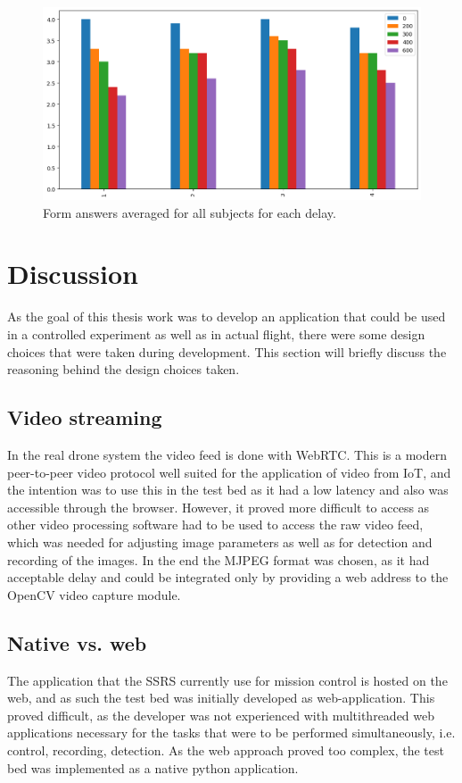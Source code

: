 \documentclass[nofilelist]{cslthse-msc}
\begin{document}
\begin{figure}[!hbt]
   \centering
   \includegraphics[scale=0.6]{images/form-ans.png} 
   \caption{Form answers averaged for all subjects for each delay.}
   \label{fig:form-ans}
\end{figure}

\chapter{Discussion}
As the goal of this thesis work was to develop an application that could be used in a controlled experiment as well as in actual flight, there were some design choices that were taken during development. This section will briefly discuss the reasoning behind the design choices taken.

\section{Video streaming}
In the real drone system the video feed is done with WebRTC. This is a modern peer-to-peer video protocol well suited for the application of video from IoT, and the intention was to use this in the test bed as it had a low latency and also was accessible through the browser. However, it proved more difficult to access as other video processing software had to be used to access the raw video feed, which was needed for adjusting image parameters as well as for detection and recording of the images. In the end the MJPEG format was chosen, as it had acceptable delay and could be integrated only by providing a web address to the OpenCV video capture module.

\section{Native vs. web}
The application that the SSRS currently use for mission control is hosted on the web, and as such the test bed was initially developed as web-application. This proved difficult, as the developer was not experienced with multithreaded web applications necessary for the tasks that were to be performed simultaneously, i.e. control, recording, detection. As the web approach proved too complex, the test bed was implemented as a native python application.
\end{document}
